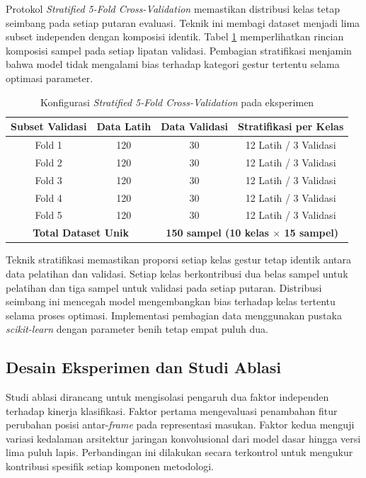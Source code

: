 Protokol \textit{Stratified 5-Fold Cross-Validation} memastikan distribusi kelas tetap seimbang pada setiap putaran evaluasi. 
Teknik ini membagi dataset menjadi lima subset independen dengan komposisi identik. 
Tabel \ref{tab:3-kfold-config} memperlihatkan rincian komposisi sampel pada setiap lipatan validasi. 
Pembagian stratifikasi menjamin bahwa model tidak mengalami bias terhadap kategori gestur tertentu selama optimasi parameter.

\begin{table}[H]
    \centering
    \caption{Konfigurasi \textit{Stratified 5-Fold Cross-Validation} pada eksperimen}
    \label{tab:3-kfold-config}
    \renewcommand{\arraystretch}{1.15}
    \begin{tabular}{|c|c|c|c|}
    \hline
    \textbf{Subset Validasi} & \textbf{Data Latih} & \textbf{Data Validasi} & \textbf{Stratifikasi per Kelas} \\ \hline
    Fold 1 & 120 & 30 & 12 Latih / 3 Validasi \\ \hline
    Fold 2 & 120 & 30 & 12 Latih / 3 Validasi \\ \hline
    Fold 3 & 120 & 30 & 12 Latih / 3 Validasi \\ \hline
    Fold 4 & 120 & 30 & 12 Latih / 3 Validasi \\ \hline
	Fold 5 & 120 & 30 & 12 Latih / 3 Validasi \\ \hline
	\multicolumn{2}{|c|}{\textbf{Total Dataset Unik}} & \multicolumn{2}{c|}{\textbf{150 sampel (10 kelas $\times$ 15 sampel)}} \\ \hline
	\end{tabular}
\end{table}

Teknik stratifikasi memastikan proporsi setiap kelas gestur tetap identik antara data pelatihan dan validasi. 
Setiap kelas berkontribusi dua belas sampel untuk pelatihan dan tiga sampel untuk validasi pada setiap putaran. 
Distribusi seimbang ini mencegah model mengembangkan bias terhadap kelas tertentu selama proses optimasi. 
Implementasi pembagian data menggunakan pustaka \textit{scikit-learn} dengan parameter benih tetap empat puluh dua.

\subsection{Desain Eksperimen dan Studi Ablasi}
\label{subsec:eksperimen-ablasi}
Studi ablasi dirancang untuk mengisolasi pengaruh dua faktor independen terhadap kinerja klasifikasi. 
Faktor pertama mengevaluasi penambahan fitur perubahan posisi antar-\textit{frame} pada representasi masukan. 
Faktor kedua menguji variasi kedalaman arsitektur jaringan konvolusional dari model dasar hingga versi lima puluh lapis. 
Perbandingan ini dilakukan secara terkontrol untuk mengukur kontribusi spesifik setiap komponen metodologi.

